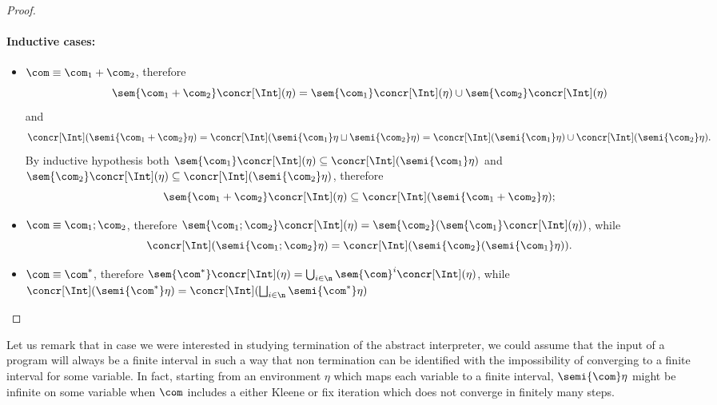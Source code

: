\begin{proof}
  \paragraph*{Inductive cases:\\}
  \begin{itemize}
  \item \(\com \equiv \com_1 + \com_2\), therefore \[\sem{\com_1 +
        \com_2}\concr[\Int](\eta) = \sem{\com_1}\concr[\Int](\eta) \cup
      \sem{\com_2}\concr[\Int](\eta)\] and \[\concr[\Int](\semi{\com_1 +
        \com_2}\eta) = \concr[\Int](\semi{\com_1}\eta \sqcup
      \semi{\com_2}\eta) = \concr[\Int](\semi{\com_1}\eta) \cup
      \concr[\Int](\semi{\com_2}\eta).\] By inductive hypothesis both
    \(\sem{\com_1}\concr[\Int](\eta) \subseteq
    \concr[\Int](\semi{\com_1}\eta)\) and
    \(\sem{\com_2}\concr[\Int](\eta) \subseteq
    \concr[\Int](\semi{\com_2}\eta)\), therefore \[\sem{\com_1 +
        \com_2}\concr[\Int](\eta) \subseteq \concr[\Int](\semi{\com_1 +
        \com_2}\eta);\]
  \item \(\com \equiv \com_1 ; \com_2\), therefore
    \(\sem{\com_1;\com_2}\concr[\Int](\eta) =
    \sem{\com_2}(\sem{\com_1}\concr[\Int](\eta))\), while
    \[\concr[\Int](\semi{\com_1; \com_2}\eta) =
      \concr[\Int] (\semi{\com_2}( \semi{\com_1}\eta)).\]
  \item \(\com \equiv \com^*\), therefore
    \(\sem{\com^*}\concr[\Int](\eta) =
    \bigcup_{i\in\n}\sem{\com}^i\concr[\Int](\eta)\), while
    \(\concr[\Int](\semi{\com^*}\eta) =
    \concr[\Int](\bigsqcup_{i\in\n}\semi{\com^*}\eta)\)
  \end{itemize}
\end{proof}

\begin{remark}
  Let us remark that in case we were interested in studying
  termination of the abstract interpreter, we could assume that the
  input of a program will always be a finite interval in such a way
  that non termination can be identified with the impossibility of
  converging to a finite interval for some variable. In fact, starting
  from an environment \(\eta\) which maps each variable to a finite
  interval, \(\semi{\com}\eta\) might be infinite on some variable
  when \(\com\) includes a either Kleene or fix iteration which does
  not converge in finitely many steps.
\end{remark}